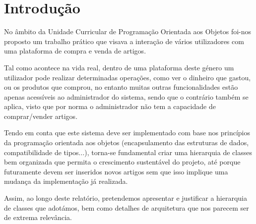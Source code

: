 \chapter{Introdução}

    No âmbito da Unidade Curricular de Programação Orientada aos Objetos foi-nos proposto um trabalho prático que visava a interação de vários utilizadores com uma plataforma de compra e venda de artigos.

    Tal como acontece na vida real, dentro de uma plataforma deste género um utilizador pode realizar determinadas operações, como ver o dinheiro que gastou, ou os produtos que comprou, no entanto muitas outras funcionalidades estão apenas acessíveis ao administrador do sistema, sendo que o contrário também se aplica, visto que por norma o administrador não tem a capacidade de comprar/vender artigos.

    Tendo em conta que este sistema deve ser implementado com base nos princípios da programação orientada aos objetos (encapsulamento das estruturas de dados, compatibilidade de tipos...), torna-se fundamental criar uma hierarquia de classes bem organizada que permita o crescimento sustentável do projeto, até porque futuramente devem ser inseridos novos artigos sem que isso implique uma mudança da implementação já realizada.

    Assim, ao longo deste relatório, pretendemos apresentar e justificar a hierarquia de classes que adotámos, bem como detalhes de arquitetura que nos parecem ser de extrema relevância.